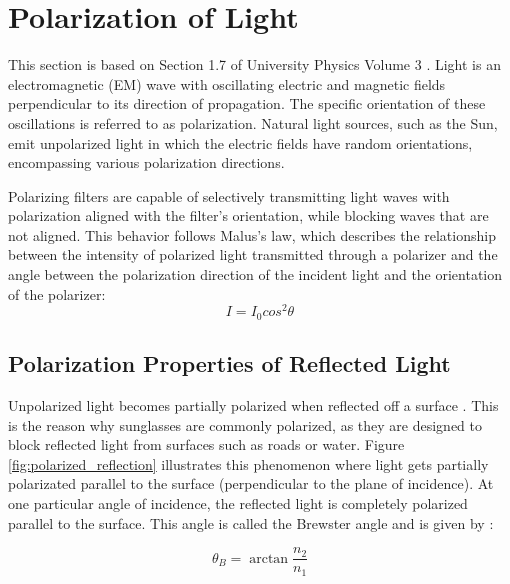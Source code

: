 \section{Polarization of Light}
This section is based on Section 1.7 of University Physics Volume 3 \cite[30-33]{lingUniversityPhysicsVolume2016}.
Light is an electromagnetic (EM) wave with oscillating electric and magnetic fields perpendicular to its direction of propagation.
The specific orientation of these oscillations is referred to as polarization.
Natural light sources, such as the Sun, emit unpolarized light in which the electric fields have random orientations, encompassing various polarization directions.

Polarizing filters are capable of selectively transmitting light waves with polarization aligned with the filter's orientation, while blocking waves that are not aligned.
This behavior follows Malus's law, which describes the relationship between the intensity of polarized light transmitted through a polarizer and the angle between the polarization direction of the incident light and the orientation of the polarizer:
\begin{equation}
    I = I_0 cos^2 \theta
\end{equation}

\subsection{Polarization Properties of Reflected Light}
Unpolarized light becomes partially polarized when reflected off a surface \cite[34]{lingUniversityPhysicsVolume2016}.
This is the reason why sunglasses are commonly polarized, as they are designed to block reflected light from surfaces such as roads or water.
Figure \ref{fig:polarized_reflection} illustrates this phenomenon where light gets partially polarizated parallel to the surface (perpendicular to the plane of incidence).
At one particular angle of incidence, the reflected light is completely polarized parallel to the surface.
This angle is called the Brewster angle and is given by \cite{BrewsterAngle2023}:

\begin{equation}
    \theta_B = \arctan{\frac{n_2}{n_1}}
\end{equation}

